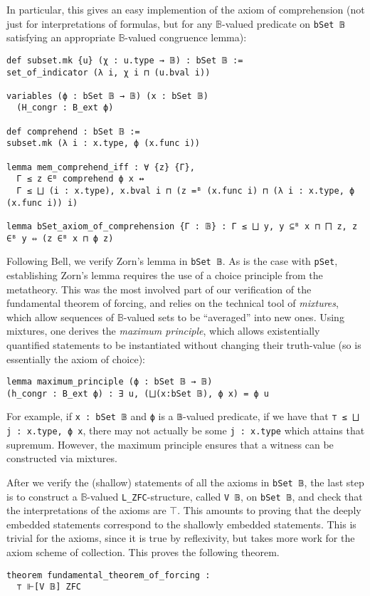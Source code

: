 \documentclass[sigplan,10pt,review, anonymous]{acmart}
\newcommand{\B}{\mathbb{B}}
\newcommand{\lil}{\lstinline}
\theoremstyle{definition}
\begin{document}
In particular, this gives an easy implemention of the axiom of comprehension (not just for interpretations of formulas, but for any \(\mathbb{B}\)-valued predicate on \lil{bSet 𝔹} satisfying an appropriate \(\mathbb{B}\)-valued congruence lemma): \label{def:comprehension} %
\begin{lstlisting}
def subset.mk {u} (χ : u.type → 𝔹) : bSet 𝔹 :=
set_of_indicator (λ i, χ i ⊓ (u.bval i))

variables (ϕ : bSet 𝔹 → 𝔹) (x : bSet 𝔹)
  (H_congr : B_ext ϕ)

def comprehend : bSet 𝔹 :=
subset.mk (λ i : x.type, ϕ (x.func i))

lemma mem_comprehend_iff : ∀ {z} {Γ},
  Γ ≤ z ∈ᴮ comprehend ϕ x ↔
  Γ ≤ ⨆ (i : x.type), x.bval i ⊓ (z =ᴮ (x.func i) ⊓ (λ i : x.type, ϕ (x.func i)) i)

lemma bSet_axiom_of_comprehension {Γ : 𝔹} : Γ ≤ ⨆ y, y ⊆ᴮ x ⊓ ⨅ z, z ∈ᴮ y ⇔ (z ∈ᴮ x ⊓ ϕ z)
\end{lstlisting}
Following Bell, we verify Zorn's lemma in \lil{bSet 𝔹}.
As is the case with \lil{pSet}, establishing Zorn's lemma requires the use of a choice principle from the metatheory.
This was the most involved part of our verification of the fundamental theorem of forcing, and relies on the technical tool of \emph{mixtures}, which allow sequences of $\B$-valued sets to be ``averaged'' into new ones. Using mixtures, one derives the \emph{maximum principle}, which allows existentially quantified statements to be instantiated without changing their truth-value (so is essentially the axiom of choice):
\begin{lstlisting}
lemma maximum_principle (ϕ : bSet 𝔹 → 𝔹)
(h_congr : B_ext ϕ) : ∃ u, (⨆(x:bSet 𝔹), ϕ x) = ϕ u
\end{lstlisting}
For example, if \lil{x : bSet 𝔹} and \lil{ϕ} is a \lil{𝔹}-valued predicate, if we have that \lil{⊤ ≤ ⨆ j : x.type, ϕ x}, there may not actually be some \lil{j : x.type} which attains that supremum. However, the maximum principle ensures that a witness can be constructed via mixtures.


After we verify the (shallow) statements of all the axioms in \lil{bSet 𝔹}, the last step is to construct a \(\mathbb{B}\)-valued \lil{L_ZFC}-structure, called \lil{V 𝔹}, on \lil{bSet 𝔹}, and check that the interpretations of the axioms are \(\top\). This amounts to proving that the deeply embedded statements correspond to the shallowly embedded statements. This is trivial for the axioms, since it is true by reflexivity, but takes more work for the axiom scheme of collection. This proves the following theorem.
\begin{lstlisting}
theorem fundamental_theorem_of_forcing :
  ⊤ ⊩[V 𝔹] ZFC
\end{lstlisting}
\end{document}
